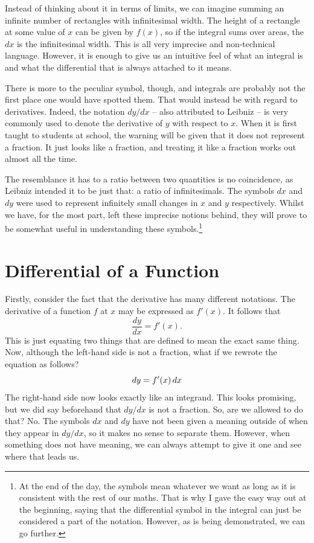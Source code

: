 \documentclass[a4paper,12pt]{article}
\begin{document}
Instead of thinking about it in terms of limits, we can imagine summing an infinite number of rectangles with infinitesimal width.
The height of a rectangle at some value of $x$ can be given by $f(x)$, so if the integral sums over areas, the $dx$ is the infinitesimal width.
This is all very imprecise and non-technical language.
However, it is enough to give us an intuitive feel of what an integral is and what the differential that is always attached to it means.

There is more to the peculiar symbol, though, and integrals are probably not the first place one would have spotted them.
That would instead be with regard to derivatives.
Indeed, the notation $dy/dx$ -- also attributed to Leibniz -- is very commonly used to denote the derivative of $y$ with respect to $x$.
When it is first taught to students at school, the warning will be given that it does not represent a fraction.
It just looks like a fraction, and treating it like a fraction works out almost all the time.

The resemblance it has to a ratio between two quantities is no coincidence, as Leibniz intended it to be just that: a ratio of infinitesimals.
The symbols $dx$ and $dy$ were used to represent infinitely small changes in $x$ and $y$ respectively.
Whilst we have, for the most part, left these imprecise notions behind, they will prove to be somewhat useful in understanding these symbols.\footnote{At the end of the day, the symbols mean whatever we want as long as it is consistent with the rest of our maths. That is why I gave the easy way out at the beginning, saying that the differential symbol in the integral can just be considered a part of the notation. However, as is being demonstrated, we can go further.}

\section{Differential of a Function}

Firstly, consider the fact that the derivative has many different notations.
The derivative of a function $f$ at $x$ may be expressed as $f'(x)$.
It follows that
\begin{equation*}
    \frac{dy}{dx} = f'(x).
\end{equation*}
This is just equating two things that are defined to mean the exact same thing.
Now, although the left-hand side is not a fraction, what if we rewrote the equation as follows?
\begin{equation*}
    dy = f'(x) \mathop{}\!d x
\end{equation*}
The right-hand side now looks exactly like an integrand.
This looks promising, but we did say beforehand that $dy/dx$ is not a fraction.
So, are we allowed to do that?
No. The symbols $dx$ and $dy$ have not been given a meaning outside of when they appear in $dy/dx$, so it makes no sense to separate them.
However, when something does not have meaning, we can always attempt to give it one and see where that leads us.
\end{document}
